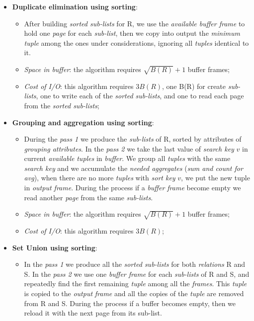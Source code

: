 \documentclass{article}
\begin{document}
\begin{itemize}
\item \textbf{Duplicate elimination using sorting}:
\begin{itemize}
\item After building \emph{sorted sub-lists} for R, we use the \emph{available buffer frame} to hold one \emph{page} for each \emph{sub-list}, then we copy into output the \emph{minimum tuple} among the ones under considerations, ignoring all \emph{tuples} identical to it. 
\item \emph{Space in buffer}: the algorithm requires $\sqrt{B(R)} +1$ buffer frames;
\item \emph{Cost of I/O}: this algorithm requires $3B(R)$, one B(R) for create \emph{sub-lists}, one to write each of the \emph{sorted sub-lists}, and one to read each page from the \emph{sorted sub-lists};
\end{itemize}
\item \textbf{Grouping and aggregation using sorting}:
\begin{itemize}
\item During the \emph{pass 1} we produce the \emph{sub-lists} of R, sorted by attributes of \emph{grouping attributes}. In the\emph{ pass 2 }we take the last value of \emph{search key} $v$ in current \emph{available} \emph{tuples} in \emph{buffer}. We group all \emph{tuples} with the same \emph{search key} and we accumulate the \emph{needed aggregates} (\emph{sum and count for avg}), when there are no more \emph{tuples} with \emph{sort key }$v$, we put the new tuple in \emph{output frame}. During the process if a \emph{buffer frame} become empty we read another \emph{page} from the same \emph{sub-lists}.
\item \emph{Space in buffer}: the algorithm requires $\sqrt{B(R)} +1$ buffer frames;
\item \emph{Cost of I/O}: this algorithm requires $3B(R)$;
\end{itemize}
\item \textbf{Set Union using sorting}:
\begin{itemize}
\item In the\emph{ pass 1} we produce all the \emph{sorted sub-lists} for both \emph{relations} R and S. In the \emph{pass 2} we use one \emph{buffer frame} for each \emph{sub-lists} of R and S, and repeatedly find the first remaining \emph{tuple} among all the \emph{frames}. This \emph{tuple} is copied to the \emph{output} \emph{frame} and all the copies of the \emph{tuple} are removed from R and S. During the process if a buffer becomes empty, then we reload it with the next page from its sub-list.

\end{itemize}
\end{itemize}
\end{document}
